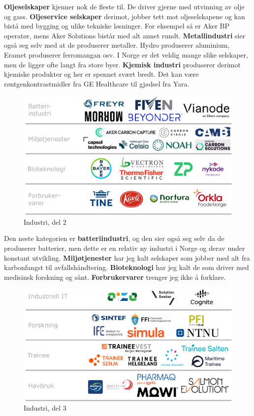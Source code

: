 \textbf{Oljeselskaper} kjenner nok de fleste til. De driver gjerne med utvinning av olje og gass. \textbf{Oljeservice selskaper} derimot, jobber tett mot oljeselskapene og kan bistå med bygging og ulike tekniske løsninger. For eksempel så er Aker BP operatør, mens Aker Solutions bistår med alt annet rundt. \textbf{Metallindustri} sier også seg selv med at de produserer metaller. Hydro produserer aluminium, Eramet produserer ferromangan osv. I Norge er det veldig mange slike selskaper, men de ligger ofte langt fra store byer. \textbf{Kjemisk industri} produserer derimot kjemiske produkter og her er spennet svært bredt. Det kan være røntgenkontrastmidler fra GE Healthcare til gjødsel fra Yara. 

\begin{figure}[H]
    \centering
    \includegraphics[width=1\linewidth]{images/Industri2.pdf}
    \caption{Industri, del 2}
    \label{fig:industri2}
\end{figure}

Den neste kategorien er \textbf{batteriindustri}, og den sier også seg selv da de produserer batterier, men dette er en relativ ny industri i Norge og derav under konstant utvikling. \textbf{Miljøtjenester} har jeg kalt selskaper som jobber med alt fra karbonfangst til avfallshåndtering. \textbf{Bioteknologi} har jeg kalt de som driver med medisinsk forskning og sånt. \textbf{Forbrukervarer} trenger jeg ikke å forklare.

\begin{figure}[H]
    \centering
    \includegraphics[width=1\linewidth]{images/Industri3.pdf}
    \caption{Industri, del 3}
    \label{fig:industri3}
\end{figure}

